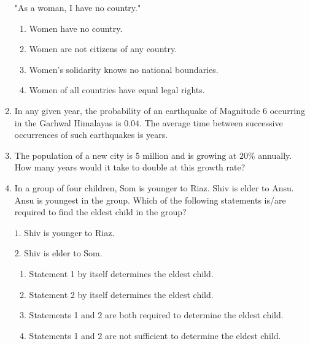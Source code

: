 \documentclass[journal,12pt,onecolumn]{IEEEtran}
\theoremstyle{remark}
\begin{document}
\begin{enumerate}
    "As a woman, I have no country."
    
    \hfill{}
    \begin{enumerate}
        \item Women have no country.
        \item Women are not citizens of any country.
        \item Women's solidarity knows no national boundaries.
        \item Women of all countries have equal legal rights.
    \end{enumerate}

    \item In any given year, the probability of an earthquake of Magnitude $6$ occurring in the Garhwal Himalayas is $0.04$. The average time between successive occurrences of such earthquakes is \underline{\hspace{2cm}} years.
    
    \hfill{}

    \item The population of a new city is $5$ million and is growing at $20\%$ annually. How many years would it take to double at this growth rate?
    
    \hfill{}
    \begin{enumerate}
    \end{enumerate}

    \item In a group of four children, Som is younger to Riaz. Shiv is elder to Ansu. Ansu is youngest in the group. Which of the following statements is/are required to find the eldest child in the group?
    
    $1$. Shiv is younger to Riaz.
    
    $2$. Shiv is elder to Som.
    
    \hfill{}
    \begin{enumerate}
        \item Statement 1 by itself determines the eldest child.
        \item Statement 2 by itself determines the eldest child.
        \item Statements 1 and 2 are both required to determine the eldest child.
        \item Statements 1 and 2 are not sufficient to determine the eldest child.
    \end{enumerate}


\end{enumerate}
\end{document}
